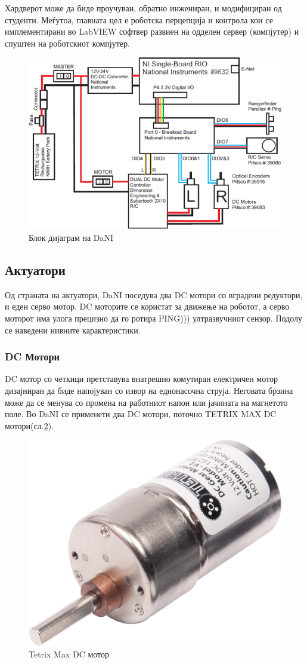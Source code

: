 \documentclass[12pt]{article}
\begin{document}
	Хардверот може да биде проучуван, обратно инжениран, и модифициран од студенти. Меѓутоа, главната цел е роботска перцепција и контрола кои се имплементирани во LabVIEW софтвер развиен на одделен сервер (компјутер) и спуштен на роботскиот компјутер.

	\begin{figure}[H]
		\includegraphics[width=0.75\linewidth]{./images/dani_block_diagram.png}
		\centering
		\caption{Блок дијаграм на DaNI}
		\label{fig:dani_block_diagram.png}
		\end{figure}

	\subsection{Актуатори}
		Од страната на актуатори, DaNI поседува два DC мотори со вградени редуктори, и еден серво мотор. DC моторите се користат за движење на роботот, а серво моторот има улога прецизно да го ротира PING))) ултразвучниот сензор. Подолу се наведени нивните карактеристики.

	\subsubsection{DC Мотори}
		DC мотор со четкици претставува внатрешно комутиран електричен мотор дизајниран да биде напојуван со извор на еднонасочна струја. Неговата брзина може да се менува со промена на работниот напон или јачината на магнетото поле.
		Во DaNI се применети два DC мотори, поточно TETRIX MAX DC мотори(сл.\ref{fig:dc_motor_iso.png}).

		\begin{figure}[H]
    	\includegraphics[width=0.35\linewidth]{./images/dc_motor_iso.png}
			\centering
			\caption{Tetrix Max DC мотор}
			\label{fig:dc_motor_iso.png}
			\end{figure}
\end{document}
